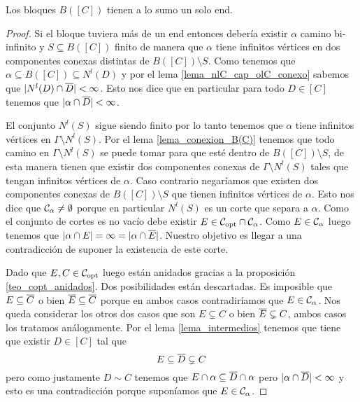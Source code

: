 \documentclass[tesis.tex]{subfiles}
\begin{document}
\begin{lema}\label{lema_bloques_1_end}
	Los bloques $B([C])$ tienen a lo sumo un solo end.
\end{lema}
\begin{proof}
	Si el bloque tuviera más de un end entonces debería existir $\alpha$ camino bi-infinito y $S \subseteq B([C])$ finito de manera que $\alpha$ tiene infinitos vértices en dos componentes conexas distintas de $B([C]) \setminus S$.
	Como tenemos que $\alpha \subseteq B([C]) \subseteq N^l(D)$ y por el lema \ref{lema_nlC_cap_olC_conexo} sabemos que $|N^l(D) \cap \overline D | < \infty$.
	Esto nos dice que en particular para todo $D \in [C]$ tenemos que $|\alpha \cap \overline D| < \infty$.
	
	El conjunto $N^l(S)$ sigue siendo finito por lo tanto tenemos que $\alpha$ tiene infinitos vértices en $\Gamma \setminus N^l(S)$.
	Por el lema \ref{lema_conexion_B(C)} tenemos que todo camino en $\Gamma \setminus N^l(S)$ se puede tomar para que esté dentro de $B([C]) \setminus S$, de esta manera tienen que existir dos componentes conexas de $\Gamma \setminus N^l(S)$ tales que tengan infinitos vértices de $\alpha$. 
	Caso contrario negaríamos que existen dos componentes conexas de $B([C]) \setminus S$ que tienen infinitos vértices de $\alpha$.
	Esto nos dice que ${\cal C}_{\alpha} \neq \emptyset$ porque en particular $N^l(S)$ es un corte que separa a $\alpha$.
	Como el conjunto de cortes es no vacío debe existir $E \in {\cal C}_{\text{opt}} \cap {\cal C}_{\alpha}$.
	Como $E \in {\cal C}_{\alpha}$ luego tenemos que $|\alpha \cap E| = \infty = |\alpha \cap \overline E|$.
	Nuestro objetivo es llegar a una contradicción de suponer la existencia de este corte. 	
	
	Dado que $E,C \in {\cal C}_{\text{opt}}$ luego están anidados gracias a la proposición \ref{teo_copt_anidados}.
	Dos posibilidades están descartadas. 
	Es imposible que $E \subseteq \overline C$ o bien $\overline E \subseteq \overline C$ porque en ambos casos contradiríamos que $E \in {\cal C}_{\alpha}$.
	Nos queda considerar los otros dos casos que son $E \subsetneq C$ o bien $\overline E \subsetneq C$, ambos casos los tratamos análogamente.
	Por el lema \ref{lema_intermedios} tenemos que tiene que existir $D \in [C]$ tal que 
	\[
		E \subseteq \overline D \subsetneq C
	\]
	pero como justamente $D \sim C$ tenemos que $E \cap \alpha \subseteq \overline D \cap \alpha$ pero $|\alpha \cap \overline D| < \infty$ y esto es una contradicción porque suponíamos que $E \in {\cal C}_{\alpha}$.
\end{proof}
\end{document}

